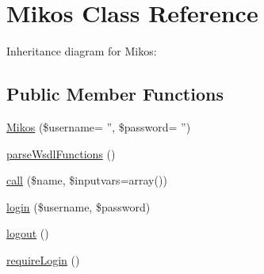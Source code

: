 \hypertarget{class_mikos}{
\section{Mikos Class Reference}
\label{class_mikos}
}
Inheritance diagram for Mikos:\subsection*{Public Member Functions}
\begin{CompactItemize}
\item 
\hyperlink{class_mikos_e653539dab7aa9260811a9743fe5bffd}{Mikos} (\$username= '', \$password= '')
\item 
\hyperlink{class_mikos_9882b0b15e6bd279d143069fed3e93be}{parseWsdlFunctions} ()
\item 
\hyperlink{class_mikos_a23685bf95bd7af11c0a0a2f6f1d2159}{call} (\$name, \$inputvars=array())
\item 
\hyperlink{class_mikos_539ff1a8891af79abcc16ed355982bef}{login} (\$username, \$password)
\item 
\hyperlink{class_mikos_19b0af84462a7a9acabffdc9d7894b2b}{logout} ()
\item 
\hyperlink{class_mikos_e37f254bc7fdba53a43813dbc792c314}{requireLogin} ()
\end{CompactItemize}
